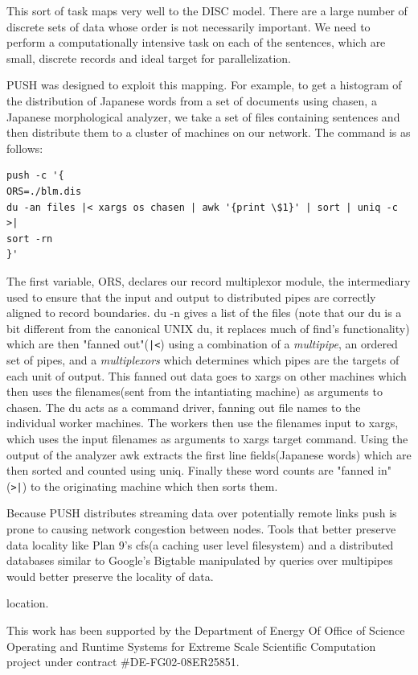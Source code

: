 \documentclass[11pt, letterpaper]{article}
\begin{document}
This sort of task maps very well to the DISC model. There are a large number of 
discrete sets of data whose order is not necessarily important. We need to 
perform a computationally intensive task on each of the sentences, which are 
small, discrete records and ideal target for parallelization. 

PUSH was designed to exploit this mapping. For example, to get a histogram of 
the distribution of Japanese words from a set of documents using chasen, 
a Japanese morphological analyzer, we take a set of files containing sentences 
and then distribute them to a cluster of machines on our network. The command 
is as follows:
\begin{verbatim}
push -c '{
ORS=./blm.dis
du -an files |< xargs os chasen | awk '{print \$1}' | sort | uniq -c >|
sort -rn
}'
\end{verbatim}

The first variable, ORS, declares our record multiplexor module, the intermediary 
used to ensure that the input and output to distributed pipes are correctly 
aligned to record boundaries. du -n gives a list of the files (note that our 
du is a bit different from the canonical UNIX du, it replaces much of find's 
functionality) which are then "fanned out"(\verb!|<!) using a combination 
of a \emph{multipipe}, an ordered set of pipes, and a \emph{multiplexors} 
which determines which pipes are the targets of each unit of output.  
This fanned out data goes to xargs on other machines which 
then uses the filenames(sent from the intantiating machine) as arguments to 
chasen. The du acts as a command driver, fanning out file names to the 
individual worker machines. The workers then use the filenames input to 
xargs, which uses the input filenames as arguments to xargs target command. 
Using the output of the analyzer awk extracts the first line fields(Japanese 
words) which are then sorted and counted using uniq.  Finally these word 
counts are "fanned in"(\verb!>|!) to the originating machine which then 
sorts them. 

Because PUSH distributes streaming data over potentially remote links push 
is prone to causing network congestion between nodes. Tools that better 
preserve data locality like Plan 9's cfs(a caching user level filesystem) 
and a distributed databases similar to Google's Bigtable\cite{chang2006bds} 
manipulated by queries over multipipes would better preserve the locality of data. 

location.

This work has been supported by the Department of Energy Of Office of Science Operating and Runtime Systems for Extreme Scale Scientific Computation project under contract \#DE-FG02-08ER25851. 



\end{document}
